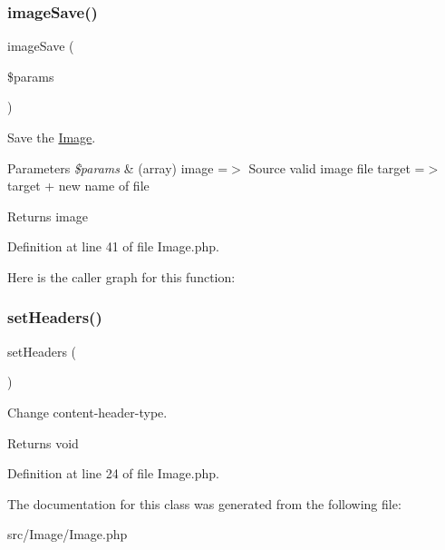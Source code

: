 \subsubsection{\texorpdfstring{image\+Save()}{imageSave()}}
{\footnotesize\ttfamily image\+Save (\begin{DoxyParamCaption}\item[{}]{\$params }\end{DoxyParamCaption})}

Save the \mbox{\hyperlink{class_zest_1_1_image_1_1_image}{Image}}.


\begin{DoxyParams}{Parameters}
{\em \$params} & (array) \textquotesingle{}image\textquotesingle{} =$>$ Source valid image file \textquotesingle{}target\textquotesingle{} =$>$ target + new name of file\\
\hline
\end{DoxyParams}
\begin{DoxyReturn}{Returns}
image 
\end{DoxyReturn}


Definition at line 41 of file Image.\+php.

Here is the caller graph for this function\+:
\mbox{\label{class_zest_1_1_image_1_1_image_a85fdb47486cf604618635df0269a51d6}} 
\subsubsection{\texorpdfstring{set\+Headers()}{setHeaders()}}
{\footnotesize\ttfamily set\+Headers (\begin{DoxyParamCaption}{ }\end{DoxyParamCaption})}

Change content-\/header-\/type.

\begin{DoxyReturn}{Returns}
void 
\end{DoxyReturn}


Definition at line 24 of file Image.\+php.



The documentation for this class was generated from the following file\+:\begin{DoxyCompactItemize}
\item 
src/\+Image/Image.\+php\end{DoxyCompactItemize}
